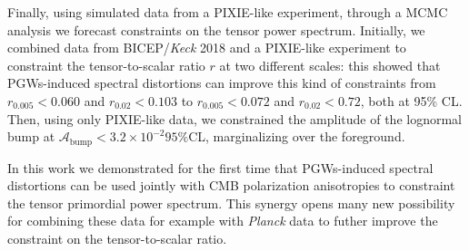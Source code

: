 \begin{adjustwidth}{1cm}{1cm}
Finally, using simulated data from a PIXIE-like experiment, through a MCMC analysis we forecast constraints on the tensor power spectrum. Initially, we combined data from BICEP/\textit{Keck} 2018 and a PIXIE-like experiment to constraint the tensor-to-scalar ratio $r$ at two different scales: this showed that PGWs-induced spectral distortions can improve this kind of constraints from $r_{0.005}<0.060$ and $r_{0.02}< 0.103$ to $r_{0.005}<0.072$ and $r_{0.02}< 0.72$, both at 95\% CL. Then, using only PIXIE-like data, we constrained the amplitude of the lognormal bump at $\mathcal{A}_\text{bump}<3.2\times10^{-2} 95\%$CL, marginalizing over the foreground.

In this work we demonstrated for the first time that PGWs-induced spectral distortions can be used jointly with CMB polarization anisotropies to constraint the tensor primordial power spectrum. This synergy opens many new possibility for combining these data for example with \emph{Planck} data to futher improve the constraint on the tensor-to-scalar ratio.
\end{adjustwidth}